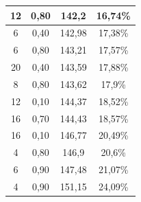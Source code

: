 \begin{center}
\begin{longtable}{|c|c|c|c|}
12 & 0,80 & 142,2 & 16,74\% \\ \hline
6 & 0,40 & 142,98 & 17,38\% \\ \hline
6 & 0,80 & 143,21 & 17,57\% \\ \hline
20 & 0,40 & 143,59 & 17,88\% \\ \hline
8 & 0,80 & 143,62 & 17,9\% \\ \hline
12 & 0,10 & 144,37 & 18,52\% \\ \hline
16 & 0,70 & 144,43 & 18,57\% \\ \hline
16 & 0,10 & 146,77 & 20,49\% \\ \hline
4 & 0,80 & 146,9 & 20,6\% \\ \hline
6 & 0,90 & 147,48 & 21,07\% \\ \hline
4 & 0,90 & 151,15 & 24,09\% \\ \hline
\end{longtable}
\label{table:historicalVolatilityAppendixTable}
\end{center}
\normalsize